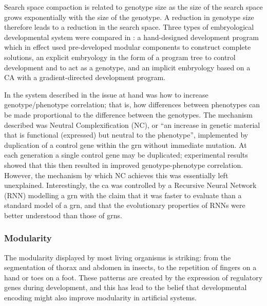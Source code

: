 Search space compaction is related to genotype size as the size of the search space grows exponentially with the size of the genotype. A reduction in genotype size therefore leads to a reduction in the search space. Three types of embryological developmental system were compared in \cite{Bentley:1999zr}: a hand-designed development program which in effect used pre-developed modular components to construct complete solutions, an explicit embryology in the form of a program tree to control development and to act as a genotype, and an implicit embryology based on a CA with a gradient-directed development program. 

In the system described in \cite{Federici:2006pb} the issue at hand was how to increase genotype/phenotype correlation; that is, how differences between phenotypes can be made proportional to the difference between the genotypes. The mechanism described was Neutral Complexification (NC), or ``an increase in genetic material that is functional (expressed) but neutral to the phenotype'', implemented by duplication of a control gene within the \gls{grn} without immediate mutation. At each generation a single control gene may be duplicated; experimental results showed that this then resulted in improved genotype-phenotype correlation. However, the mechanism by which NC achieves this was essentially left unexplained. Interestingly, the \gls{ca} was controlled by a Recursive Neural Network (RNN) modelling a \gls{grn} with the claim that it was faster to evaluate than a standard model of a \gls{grn}, and that the evolutionary properties of RNNs were better understood than those of \glspl{grn}.

\subsubsection{Modularity}
The modularity displayed by most living organisms is striking: from the segmentation of thorax and abdomen in insects, to the repetition of fingers on a hand or toes on a foot.  These patterns are created by the expression of regulatory genes during development, and this has lead to the belief that developmental encoding might also improve modularity in artificial systems. 

